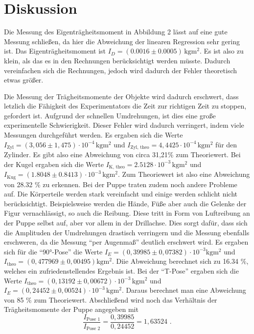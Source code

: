 \section{Diskussion}
\label{sec:Diskussion}

Die Messung des Eigenträgheitsmoment in Abbildung 2 lässt auf eine gute Messung schließen,
da hier die Abweichung der linearen Regression sehr gering ist.
Das Eigenträgheitsmoment ist $I_{D} =  (0.0016 \pm 0.0005) \, \unit{\kilo\gram\meter\squared}$.
Es ist also zu klein, als das es in den Rechnungen berücksichtigt werden müsste.
Dadurch vereinfachen sich die Rechnungen, jedoch wird dadurch der Fehler theoretisch etwas größer.

Die Messung der Trägheitsmomente der Objekte wird dadurch erschwert, dass letzlich die Fähigkeit des Experimentators die Zeit zur 
richtigen Zeit zu stoppen, gefordert ist.
Aufgrund der schnellen Umdrehungen, ist dies eine große experimentelle Schwierigkeit.
Dieser Fehler wird dadurch verringert, indem viele Messungen durchgeführt werden.
Es ergaben sich die Werte $I_{\text{Zyl}} = (3,056 \pm 1,475) \cdot 10^{-4} \, \unit{\kilo\gram\meter\squared}$
und $I_{\text{Zyl, theo}} = 4,4425 \cdot 10^{-4} \, \unit{\kilo\gram\meter\squared}$ für den Zylinder. Es gibt also eine Abweichung
von circa 31,21\% zum Theoriewert.
Bei der Kugel ergaben sich die Werte $ I_{\text{K, theo}} = 2.5128 \cdot 10^{-3} \, \unit{\kilo\gram\meter\squared}$ und
$ I_{\text{Kug}} = (1.8048 \pm 0.8413) \cdot 10^{-3} \, \unit{\kilo\gram\meter\squared}$. Zum Theoriewert ist also eine Abweichung von
28.32 \% zu erkennen.
Bei der Puppe traten zudem noch andere Probleme auf.
Die Körperteile werden stark vereinfacht und einige werden schlicht nicht berücksichtigt.
Beispielsweise werden die Hände, Füße aber auch die Gelenke der Figur vernachlässigt, so auch die Reibung.
Diese tritt in Form von Luftreibung an der Puppe selbst auf, aber vor allem in der Drillachse.
Dies sorgt dafür, dass sich die Amplituden der Umdrehungen drastisch verringern und die Messung ebenfalls erschweren, da die
Messung \enquote{per Augenmaß} deutlich erschwert wird.
Es ergaben sich für die \enquote{90°-Pose} die Werte $I_E =( 0,39985 \pm 0,07382) \cdot 10^{-3}  \unit{\kilo\gram\meter\squared}$ und
$I_{\text{theo}} = (0,477969 \pm 0,00495)  \unit{\kilo\gram\meter\squared}$. Diie Abweichung berechnet sich zu 16.34 \%,
welches ein zufriedenstellendes Ergebnis ist.
Bei der \enquote{T-Pose} ergaben sich die Werte $I_{\text{theo}} = (0,13192 \pm 0,00672) \cdot 10^{-3} \, \unit{\kilo\gram\meter\squared}$
und  $I_E = (0,24452 \pm 0,00524)  \cdot 10^{-3} \, \unit{\kilo\gram\meter\squared}$.
Daraus berechnet man eine Abweichung von 85 \% zum Theoriewert.
Abschließend wird noch das Verhältnis der Trägheitsmomente der Puppe angegeben mit
\begin{equation*}
    \frac{I_\text{Pose 1}}{I_\text{Pose 2}} = \frac{0,39985}{0,24452} = 1,63524 \text{ .}
\end{equation*}

\nocite{matplotlib}
\nocite{numpy}